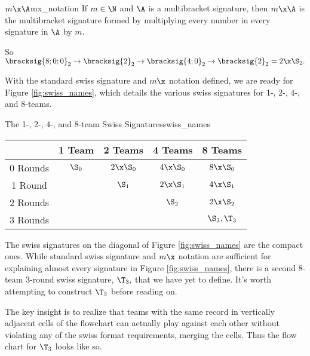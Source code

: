 {   \begin{definition}{$m\x\A$}{mx_notation}
        If $m \in \N$ and $\A$ is a multibracket signature, then $m\x\A$ is the multibracket signature formed by multiplying every number in every signature in $\A$ by $m$.
    \end{definition}

    So $\bracksig{8;0;0}_2 \to \bracksig{2}_2 \to \bracksig{4;0}_2 \to \bracksig{2}_2 = 2\x\S_2.$

    With the standard swiss signature and $m\x$ notation defined, we are ready for Figure \ref{fig:swiss_names}, which details the various swiss signatures for 1-, 2-, 4-, and 8-teams.

    \begin{figg}{The 1-, 2-, 4-, and 8-team Swiss Signatures}{swiss_names}
        \begin{center}
            \begin{tabular}{ c | c | c | c | c}
                & 1 Team & 2 Teams & 4 Teams & 8 Teams\\
                \hline
                0 Rounds & $\S_0$ & $2\x\S_0$ & $4\x\S_0$ & $8\x\S_0$\\
                \hline
                1 Round & & $\S_1$ & $2\x\S_1$ & $4\x\S_1$\\
                \hline
                2 Rounds & & & $\S_2$ & $2\x\S_2$\\
                \hline
                \multirow{1}{*}{3 Rounds} & & & &  $\S_3, \T_3$ \\
            \end{tabular}
        \end{center}
        \end{figg}

    The swiss signatures on the diagonal of Figure \ref{fig:swiss_names} are the compact ones. While standard swiss signature and $m\x$ notation are sufficient for explaining almost every signature in Figure \ref{fig:swiss_names}, there is a second 8-team 3-round swiss signature, $\T_3,$ that we have yet to define. It's worth attempting to construct $\T_3$ before reading on.

    The key insight is to realize that teams with the same record in vertically adjacent cells of the flowchart can actually play against each other without violating any of the swiss format requirements, merging the cells. Thus the flow chart for $\T_3$ looks like so.


}

